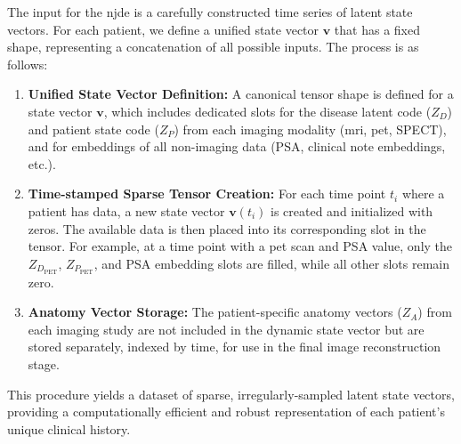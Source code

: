 \documentclass[11pt, a4paper]{article}
\begin{document}
The input for the \gls{njde} is a carefully constructed time series of latent state vectors. For each patient, we define a unified state vector $\mathbf{v}$ that has a fixed shape, representing a concatenation of all possible inputs. The process is as follows:
\begin{enumerate}
    \item \textbf{Unified State Vector Definition:} A canonical tensor shape is defined for a state vector $\mathbf{v}$, which includes dedicated slots for the disease latent code ($Z_D$) and patient state code ($Z_P$) from each imaging modality (\gls{mri}, \gls{pet}, SPECT), and for embeddings of all non-imaging data (PSA, clinical note embeddings, etc.).
    \item \textbf{Time-stamped Sparse Tensor Creation:} For each time point $t_i$ where a patient has data, a new state vector $\mathbf{v}(t_i)$ is created and initialized with zeros. The available data is then placed into its corresponding slot in the tensor. For example, at a time point with a \gls{pet} scan and PSA value, only the $Z_{D_{\text{PET}}}$, $Z_{P_{\text{PET}}}$, and PSA embedding slots are filled, while all other slots remain zero.
    \item \textbf{Anatomy Vector Storage:} The patient-specific anatomy vectors ($Z_A$) from each imaging study are not included in the dynamic state vector but are stored separately, indexed by time, for use in the final image reconstruction stage.
\end{enumerate}
This procedure yields a dataset of sparse, irregularly-sampled latent state vectors, providing a computationally efficient and robust representation of each patient's unique clinical history.
\end{document}
